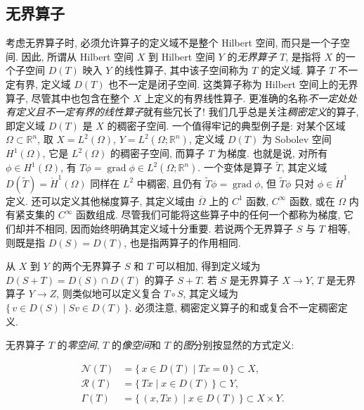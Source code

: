 \subsection{{无界算子}}\label{sec:unbounded-operators}

{考虑无界算子时, 必须允许算子的定义域不是整个 Hilbert 空间, 而只是一个子空间. 因此, 所谓从 Hilbert 空间 $X$ 到 Hilbert 空间 $Y$ 的\emph{无界算子} $T$, 是指将 $X$ 的一个子空间 $D(T)$ 映入 $Y$ 的线性算子, 其中该子空间称为 $T$ 的定义域. 算子 $T$ 不一定有界, 定义域 $D(T)$ 也不一定是闭子空间. 这类算子称为 Hilbert 空间上的无界算子, 尽管其中也包含在整个 $X$ 上定义的有界线性算子. 更准确的名称\emph{不一定处处有定义且不一定有界的线性算子}就有些冗长了! 我们几乎总是关注\emph{稠密定义}的算子, 即定义域 $D(T)$ 是 $X$ 的稠密子空间. 一个值得牢记的典型例子是: 对某个区域 $\Omega\subset\mathbb R^n$, 取 $X=L^2(\Omega)$, $Y=L^2(\Omega;\mathbb R^n)$, 定义域 $D(T)$ 为 Sobolev 空间 $H^1(\Omega)$, 它是 $L^2(\Omega)$ 的稠密子空间, 而算子 $T$ 为梯度. 也就是说, 对所有 $\phi\in H^1(\Omega)$, 有 $T\phi=\operatorname{grad}\phi\in L^2(\Omega;\mathbb R^n)$. 一个变体是算子 $\widetilde T$, 其定义域 $D(\widetilde T)=\mathring H^1(\Omega)$ 同样在 $L^2$ 中稠密, 且仍有 $\widetilde T\phi=\operatorname{grad}\phi$, 但 $\widetilde T\phi$ 只对 $\phi\in\mathring H^1$ 定义. 还可以定义其他梯度算子, 其定义域由 $\overline\Omega$ 上的 $C^1$ 函数, $C^\infty$ 函数, 或在 $\Omega$ 内有紧支集的 $C^\infty$ 函数组成. 尽管我们可能将这些算子中的任何一个都称为梯度, 它们却并不相同, 因而始终明确其定义域十分重要. 若说两个无界算子 $S$ 与 $T$ 相等, 则既是指 $D(S)=D(T)$, 也是指两算子的作用相同.}

{从 $X$ 到 $Y$ 的两个无界算子 $S$ 和 $T$ 可以相加, 得到定义域为 $D(S+T)=D(S)\cap D(T)$ 的算子 $S+T$. 若 $S$ 是无界算子 $X\to Y$, $T$ 是无界算子 $Y\to Z$, 则类似地可以定义复合 $T\circ S$, 其定义域为 $\{\,v\in D(S)\mid Sv\in D(T)\,\}$. 必须注意, 稠密定义算子的和或复合不一定稠密定义.}

{无界算子 $T$ 的\emph{零空间}, $T$ 的\emph{像空间}和 $T$ 的\emph{图}分别按显然的方式定义:}

\[
\begin{aligned}
\mathcal N(T)&=\{\,x\in D(T)\mid Tx=0\,\}\subset X,\\
\mathcal R(T)&=\{\,Tx\mid x\in D(T)\,\}\subset Y,\\
\Gamma(T)&=\{\,(x,Tx)\mid x\in D(T)\,\}\subset X\times Y.
\end{aligned}
\]

